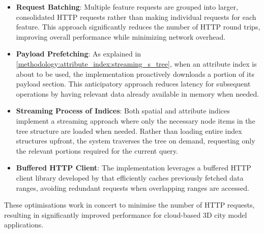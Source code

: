 \begin{itemize}
  \item \textbf{Request Batching}: Multiple feature requests are grouped into larger, consolidated HTTP requests rather than making individual requests for each feature. This approach significantly reduces the number of HTTP round trips, improving overall performance while minimizing network overhead.
  \item \textbf{Payload Prefetching}: As explained in \autoref{methodology:attribute_index:streaming_s_tree}, when an attribute index is about to be used, the implementation proactively downloads a portion of its payload section. This anticipatory approach reduces latency for subsequent operations by having relevant data already available in memory when needed.

  \item \textbf{Streaming Process of Indices}: Both spatial and attribute indices implement a streaming approach where only the necessary node items in the tree structure are loaded when needed. Rather than loading entire index structures upfront, the system traverses the tree on demand, requesting only the relevant portions required for the current query.

  \item \textbf{Buffered HTTP Client}: The implementation leverages a buffered HTTP client library developed by \citet{buffered_http_range_client} that efficiently caches previously fetched data ranges, avoiding redundant requests when overlapping ranges are accessed.

\end{itemize}

These optimisations work in concert to minimise the number of HTTP requests, resulting in significantly improved performance for cloud-based 3D city model applications.
